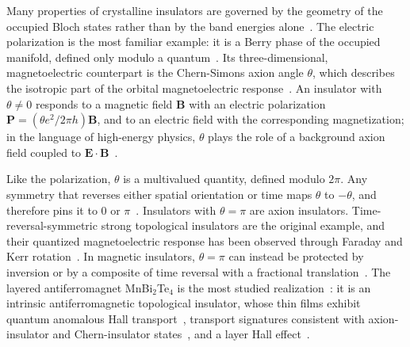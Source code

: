 \documentclass[galley,aps,pra,10pt,amsmath,amssymb,
    superscriptaddress,nofootinbib,longbibliography]{revtex4-2}
\newcounter{comm}
\def\commnext{\stepcounter{comm}}
\def\commtext{{\bf\color{blue}[\arabic{comm}]}}
\def\commmar{{\bf\color{blue}[\arabic{comm}]}}
\def\dsm#1{\commnext\marginpar{\small DS\commmar: #1}\commtext}
\def\dsm#1{}
\newcommand{\MBT}{MnBi$_2$Te$_4$}
\begin{document}
Many properties of crystalline insulators are governed by the geometry of the occupied Bloch states rather than by the band energies alone~\cite{xiao2010berry, vanderbilt2018berry}. The electric polarization is the most familiar example: it is a Berry phase of the occupied manifold, defined only modulo a quantum~\cite{kingsmith1993theory, resta1994macroscopic}. Its three-dimensional, magnetoelectric counterpart is the Chern-Simons axion angle $\theta$\dsm{I wonder if we should label the CS angle as $\theta_\text{CS}$, since later on you introduce $\alpha_\text{CS}$. This would also distinguish it from the Kubo contributions to the ME response.}, which describes the isotropic part of the orbital magnetoelectric response~\cite{qi2008topological, essin2009magnetoelectric, essin2010orbital, malashevich2010theory, coh2011chern}. An insulator with $\theta\neq0$ responds to a magnetic field $\mathbf B$ with an electric polarization $\mathbf P=(\theta e^2/2\pi h)\mathbf B$, and to an electric field with the corresponding magnetization; in the language of high-energy physics, $\theta$ plays the role of a background axion field coupled to $\mathbf E\cdot\mathbf B$~\cite{wilczek1987two}.

Like the polarization, $\theta$ is a multivalued quantity, defined modulo $2\pi$. Any symmetry that reverses either spatial orientation or time maps $\theta$ to $-\theta$, and therefore pins it to $0$ or $\pi$~\cite{qi2008topological, essin2009magnetoelectric, mong2010antiferromagnetic, hughes2011inversion, turner2012quantized, marzari2012maximally,varnava2020axion,seleznev2023towards}. Insulators with $\theta=\pi$ are axion insulators. Time-reversal-symmetric strong topological insulators are the original example, and their quantized magnetoelectric response has been observed through Faraday and Kerr rotation~\cite{wu2016quantized, armitage2019matter}. In magnetic insulators, $\theta=\pi$ can instead be protected by inversion or by a composite of time reversal with a fractional translation~\cite{mong2010antiferromagnetic}. The layered antiferromagnet \MBT{} is the most studied realization~\cite{otrokov2019prediction, li2019intrinsic, zhang2019topological, gong2019experimental}: it is an intrinsic antiferromagnetic topological insulator, whose thin films exhibit quantum anomalous Hall transport~\cite{deng2020quantum}, transport signatures consistent with axion-insulator and Chern-insulator states~\cite{liu2020robust}, and a layer Hall effect~\cite{gao2021layer}.
\end{document}
